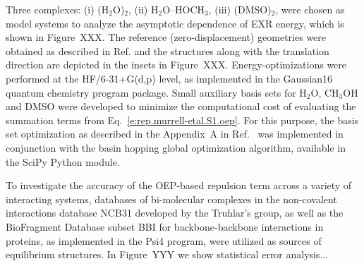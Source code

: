 Three complexes: 
(i) (H$_2$O)$_2$, 
(ii) H$_2$O--HOCH$_3$, 
(iii) (DMSO)$_2$,
were chosen as model systems to analyze the asymptotic dependence 
of EXR energy, which is shown in Figure~XXX. 
The reference (zero\hyp{}displacement) geometries
were obtained as described in Ref.\cite{Blasiak.Bednarska.Choluj.Bartkowiak.JCP.2019} 
and the structures  
along with the translation direction are depicted
in the insets in Figure~XXX.
Energy\hyp{}optimizations were performed at the HF/6-31+G(d,p) level,
as implemented in 
the {\sc Gaussian16} quantum chemistry program package.\cite{Gaussian16}
Small auxiliary basis sets for H$_2$O, CH$_3$OH and DMSO were developed
to minimize the computational cost of evaluating the summation terms
from Eq.~\eqref{e:rep.murrell-etal.S1.oep}. For this purpose, the basis set optimization 
as described in the Appendix~A in Ref.~\cite{Blasiak.Bednarska.Choluj.Bartkowiak.JCP.2019} was implemented
in conjunction with the basin hopping global optimization algorithm,  %
available in the SciPy Python module. %



To investigate the accuracy of the OEP\hyp{}based repulsion
term across
a variety of
interacting systems, databases
of bi\hyp{}molecular complexes in the non\hyp{}covalent
interactions database NCB31 developed by the Truhlar's 
group,\cite{Zhao.Schultz.Truhlar.JCTC.2006,
Zhao.Truhlar.JCTC.2005,Zhao.Schultz.Truhlar.JCTC.2006,Zhao.Schultz.Truhlar.JCP.2005}
as well as the BioFragment Database subset BBI for backbone\hyp{}backbone
interactions in proteins,\cite{Burns.Faver.Zheng.Marshall.Smith.Vanommeslaeghe.MacKerell.Merz.Sherrill.JCP.2017} 
as implemented in the {\sc Psi4}
program,\cite{Psi4.JCTC.2017}
were utilized as sources of equilibrium structures. 
In Figure~YYY we show statistical error analysis...






